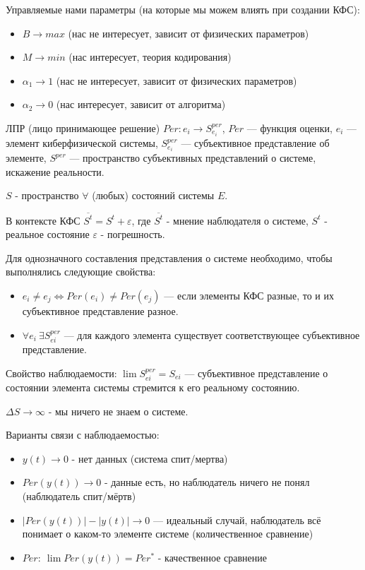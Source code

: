 \documentclass{article}
\begin{document}
\begin{sloppypar}
    Управляемые нами параметры (на которые мы можем влиять при создании КФС):
    \begin{itemize}
        \item $B \rightarrow max$ (нас не интересует, зависит от физических параметров)
        \item $M \rightarrow min$ (нас интересует, теория кодирования)
        \item $\alpha_1 \rightarrow 1$ (нас не интересует, зависит от физических параметров)
        \item $\alpha_2 \rightarrow 0$ (нас интересует, зависит от алгоритма)
    \end{itemize}

    ЛПР (лицо принимающее решение)
    $Per : e_i \rightarrow S_{e_i}^{per}$, $Per$ — функция оценки, $e_i$ — элемент киберфизической системы, $S_{e_i}^{per}$ — субъективное представление об элементе, $S^{per}$ — пространство субъективных представлений о системе, искажение реальности.

    $S$ - пространство $\forall$ (любых) состояний системы $E$.

    В контексте КФС $\overline{S^t} = S^t + \varepsilon$, где $\overline{S^t}$ - мнение наблюдателя о системе, $S^t$ - реальное состояние $\varepsilon$ - погрешность.

    Для однозначного составления представления о системе необходимо, чтобы выполнялись следующие свойства:
    \begin{itemize}
        \item $e_i \neq e_j \Leftrightarrow Per(e_i) \neq Per(e_j)$ — если элементы КФС разные, то и их субъективное представление разное.
        \item $\forall e_i\ \exists S^{per}_{ei}$ — для каждого элемента существует соответствующее субъективное представление.
    \end{itemize}

    Свойство наблюдаемости: $\lim S_{ei}^{per} = S_{ei}$ — субъективное представление о состоянии элемента системы стремится к его реальному состоянию.

    $\Delta S \rightarrow \infty$ - мы ничего не знаем о системе.

    Варианты связи с наблюдаемостью:
    \begin{itemize}
        \item $y(t) \rightarrow 0$ - нет данных (система спит/мертва)
        \item $Per(y(t)) \rightarrow 0$ - данные есть, но наблюдатель ничего
              не понял (наблюдатель спит/мёртв)
        \item $|Per(y(t))| - |y(t)| \rightarrow 0$ — идеальный случай, наблюдатель всё понимает о каком-то элементе системе (количественное сравнение)
        \item $Per:\ \lim Per(y(t)) = Per^*$ - качественное сравнение
    \end{itemize}


\end{sloppypar}
\end{document}

